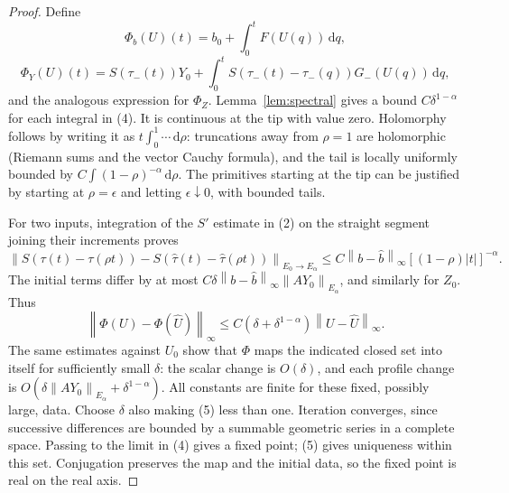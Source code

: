 \documentclass[11pt]{article}
\newcommand{\dd}{\,\mathrm d}
\newcommand{\norm}[1]{\left\lVert#1\right\rVert}
\begin{document}
\begin{proof}
Define
\[
 \Phi_b(U)(t)=b_0+\int_0^tF(U(q))\dd q,
\]
\[
 \Phi_Y(U)(t)=S(\tau_-(t))Y_0+
 \int_0^t S(\tau_-(t)-\tau_-(q))G_-(U(q))\dd q, \tag{4}
\]
and the analogous expression for $\Phi_Z$.
Lemma~\ref{lem:spectral} gives a bound $C\delta^{1-\alpha}$ for each integral in (4).
It is continuous at the tip with value zero. Holomorphy follows by
writing it as $t\int_0^1\cdots\dd\rho$: truncations away from $\rho=1$
are holomorphic (Riemann sums and the vector Cauchy formula), and the
tail is locally uniformly bounded by $C\int(1-\rho)^{-\alpha}\dd\rho$.
The primitives starting at the tip can be justified by starting at
$\rho=\epsilon$ and letting $\epsilon\downarrow0$, with bounded tails.

For two inputs, integration of the $S'$ estimate in (2) on the straight
segment joining their increments proves
\[
 \norm{S(\tau(t)-\tau(\rho t))-
 S(\widehat\tau(t)-\widehat\tau(\rho t))}_{E_0\to E_\alpha}
 \le C\norm{b-\widehat b}_\infty[(1-\rho)|t|]^{-\alpha}.
\]
The initial terms differ by at most
$C\delta\norm{b-\widehat b}_\infty\norm{AY_0}_{E_\alpha}$,
and similarly for $Z_0$. Thus
\[
 \norm{\Phi(U)-\Phi(\widehat U)}_\infty
 \le C(\delta+\delta^{1-\alpha})\norm{U-\widehat U}_\infty. \tag{5}
\]
The same estimates against $U_0$ show that $\Phi$ maps the indicated
closed set into itself for sufficiently small $\delta$: the scalar
change is $O(\delta)$, and each profile change is
$O(\delta\norm{AY_0}_{E_\alpha}+\delta^{1-\alpha})$.
All constants are finite for these fixed, possibly large, data.
Choose $\delta$ also making (5) less than one. Iteration converges,
since successive differences are bounded by a summable geometric
series in a complete space. Passing to the limit in (4) gives a fixed
point; (5) gives uniqueness within this set. Conjugation preserves the
map and the initial data, so the fixed point is real on the real axis.


\end{proof}
\end{document}
